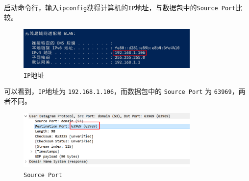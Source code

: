 \documentclass{article}
\begin{document}
启动命令行，输入\texttt{ipconfig}获得计算机的\texttt{IP}地址，与数据包中的\texttt{Source Port}比较。

\begin{figure}[H]
  \centering
  \includegraphics[width=0.8\textwidth]{img/5.png}
  \caption{\texttt{IP}地址}
\end{figure}

可以看到，\texttt{IP}地址为 \texttt{192.168.1.106}，而数据包中的 \texttt{Source Port} 为 \texttt{63969}，两者不同。

\begin{figure}[H]
  \centering
  \includegraphics[width=0.8\textwidth]{img/6.png}
  \caption{\texttt{Source Port}}
\end{figure}
\end{document}
